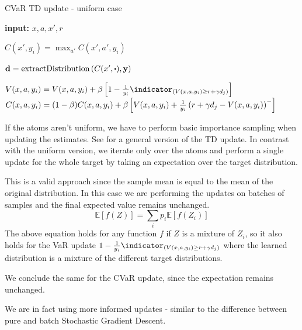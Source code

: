 \begin{algorithm}
\caption{CVaR TD update - uniform case}
\begin{algorithmic}[1]\label{alg:cvartd}

    \STATE \textbf{input:} $x, a, x', r$
    
	\STATE $C(x', y_i) = \max_{a'} C(x', a', y_i)$ \label{alg:cvartd:1}
	\ENDFOR
	
	\STATE $\mathbf{d}= \text{extractDistribution}\bround{C(x', \bigcdot), \mathbf{y}}$ \label{alg:cvartd:2}

	\STATE $V(x, a, y_i) = V(x, a, y_i) + \beta \bsquare{1 - \frac{1}{y_i}\indicator_{(V(x, a, y_i) \ge r+\gamma d_j)}}$  \label{alg:cvartd:4}
	\STATE $C(x, a, y_i) = (1-\beta)C(x, a, y_i) + \beta\left[ {V(x, a, y_i) + \frac{1}{y_i}\left( {r+\gamma d_j - V(x, a, y_i)} \right)^-} \right]$\label{alg:cvartd:5}
	\ENDFOR
\end{algorithmic}
\end{algorithm}

If the atoms aren't uniform, we have to perform basic importance sampling when updating the estimates. See  for a general version of the TD update. In contrast with the uniform version, we iterate only over the atoms and perform a single update for the whole target by taking an expectation over the target distribution. 

This is a valid approach since the sample mean is equal to the mean of the original distribution. In this case we are performing the updates on batches of samples and the final expected value remains unchanged.
\begin{equation*}
\mathbb{E}[f(Z)] = \sum_i p_i \mathbb{E}[f(Z_i)]
\end{equation*}
The above equation holds for any function $f$ if $Z$ is a mixture of $Z_i$, so it also holds for the VaR update $1 - \frac{1}{y_i}\indicator_{(V(x, a, y_i) \ge r+\gamma d_j)}$ where the learned distribution is a mixture of the different target distributions.

We conclude the same for the CVaR update, since the expectation remains unchanged. 

We are in fact using more informed updates - similar to the difference between pure and batch Stochastic Gradient Descent.

